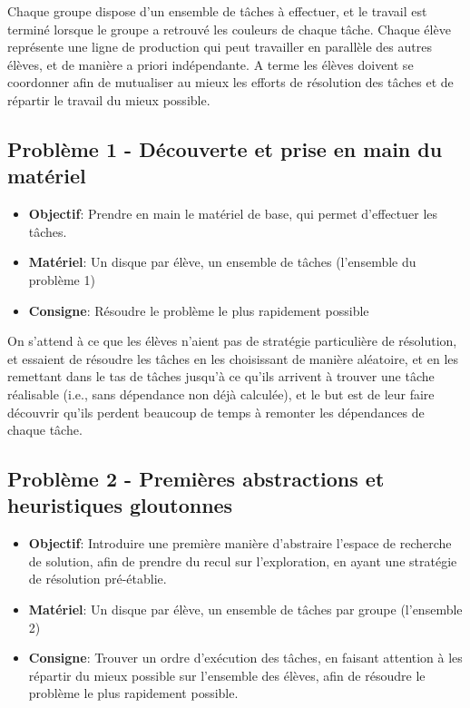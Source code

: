 \documentclass{article}
\begin{document}
Chaque groupe dispose d'un ensemble de tâches à effectuer, et le travail est terminé lorsque le groupe a retrouvé les couleurs de chaque tâche. Chaque élève représente une ligne de production qui peut travailler en parallèle des autres élèves, et de manière a priori indépendante. A terme les élèves doivent se coordonner afin de mutualiser au mieux les efforts de résolution des tâches et de répartir le travail du mieux possible.

\subsection{Problème 1 - Découverte et prise en main du matériel}

\begin{itemize}
    \item \textbf{Objectif}: Prendre en main le matériel de base, qui permet d'effectuer les tâches.
    \item \textbf{Matériel}: Un disque par élève, un ensemble de tâches (l'ensemble du problème 1)
    \item \textbf{Consigne}: Résoudre le problème le plus rapidement possible
\end{itemize}

On s'attend à ce que les élèves n'aient pas de stratégie particulière de résolution, et essaient de résoudre les tâches en les choisissant de manière aléatoire, et en les remettant dans le tas de tâches jusqu'à ce qu'ils arrivent à trouver une tâche réalisable (i.e., sans dépendance non déjà calculée), et le but est de leur faire découvrir qu'ils perdent beaucoup de temps à remonter les dépendances de chaque tâche.

\subsection{Problème 2 - Premières abstractions et heuristiques gloutonnes}

\begin{itemize}
    \item \textbf{Objectif}: Introduire une première manière d'abstraire l'espace de recherche de solution, afin de prendre du recul sur l'exploration, en ayant une stratégie de résolution pré-établie. 
    \item \textbf{Matériel}: Un disque par élève, un ensemble de tâches par groupe (l'ensemble 2)
    \item \textbf{Consigne}: Trouver un ordre d'exécution des tâches, en faisant attention à les répartir du mieux possible sur l'ensemble des élèves, afin de résoudre le problème le plus rapidement possible.
\end{itemize}
\end{document}
